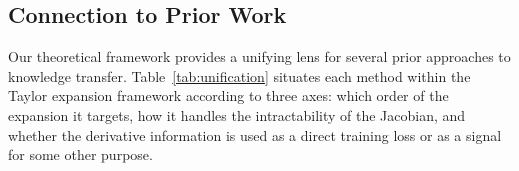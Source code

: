 \subsection{Connection to Prior Work}\label{sec:unification}

Our theoretical framework provides a unifying lens for several prior approaches to knowledge transfer.
Table~\ref{tab:unification} situates each method within the Taylor expansion framework according to three axes: which order of the expansion it targets, how it handles the intractability of the Jacobian, and whether the derivative information is used as a direct training loss or as a signal for some other purpose.


